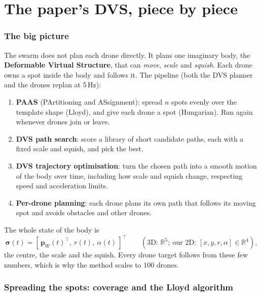\documentclass[11pt,a4paper]{article}
\newcommand{\vect}[1]{\mathbf{#1}}
\newcommand{\pW}{\vect{p}_W}
\newcommand{\R}{\mathbb{R}}
\newcommand{\T}{^{\top}}
\begin{document}
\part{The paper's DVS, piece by piece}

\section{The big picture}

The swarm does not plan each drone directly. It plans one imaginary body, the \textbf{Deformable Virtual Structure},
that can \emph{move}, \emph{scale} and \emph{squish}. Each drone owns a spot inside the body and follows it. The
pipeline (both the DVS planner and the drones replan at 5\,Hz):
\begin{enumerate}
\item \textbf{PAAS} (PArtitioning and ASsignment): spread $n$ spots evenly over the template shape (Lloyd), and
give each drone a spot (Hungarian). Run again whenever drones join or leave.
\item \textbf{DVS path search}: score a library of short candidate paths, each with a fixed scale and squish, and
pick the best.
\item \textbf{DVS trajectory optimisation}: turn the chosen path into a smooth motion of the body over time,
including how scale and squish change, respecting speed and acceleration limits.
\item \textbf{Per-drone planning}: each drone plans its own path that follows its moving spot and avoids obstacles
and other drones.
\end{enumerate}
The whole state of the body is
\[
\bm\sigma(t)=[\,\pW(t)\T,\ r(t),\ \alpha(t)\,]\T
\qquad(\text{3D: }\R^5;\ \text{our 2D: }[x,y,r,\alpha]\in\R^4),
\]
the centre, the scale and the squish. Every drone target follows from these few numbers, which is why the method
scales to 100 drones.

\section{Spreading the spots: coverage and the Lloyd algorithm}\label{sec:lloyd}
\end{document}
